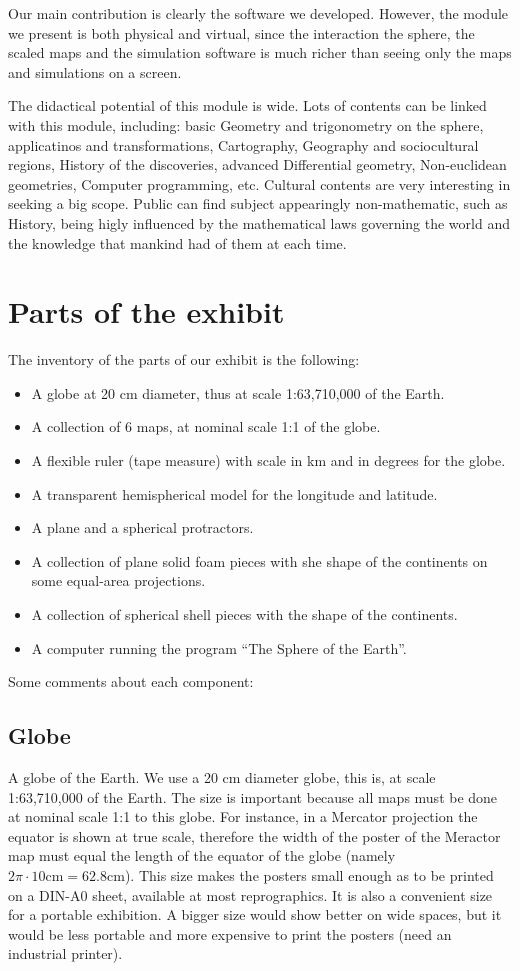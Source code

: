 \documentclass[a4paper,12pt]{article}
\begin{document}
Our main contribution is clearly the software we developed. However, the module we present is both physical and virtual, since the
interaction the sphere, the scaled maps and the simulation software is much richer than seeing only the maps and simulations on a screen.

The didactical potential of this module is wide. Lots of contents can be linked with this module, including: basic Geometry and
trigonometry on the sphere, applicatinos and transformations, Cartography, Geography and sociocultural regions, History of the discoveries,
advanced Differential geometry, Non-euclidean geometries, Computer programming, etc. Cultural contents are very interesting in seeking a
big scope. Public can find subject appearingly non-mathematic, such as History, being higly influenced by the mathematical laws governing
the world and the knowledge that mankind had of them at each time.


\section{Parts of the exhibit}
The inventory of the parts of our exhibit is the following:
\begin{itemize}
 \item A globe at 20 cm diameter, thus at scale 1:63,710,000 of the Earth.
 \item A collection of 6 maps, at nominal scale 1:1 of the globe.
 \item A flexible ruler (tape measure) with scale in km and in degrees for the globe.
 \item A transparent hemispherical model for the longitude and latitude.
 \item A plane and a spherical protractors.
 \item A collection of plane solid foam pieces with she shape of the continents on some equal-area projections.
 \item A collection of spherical shell pieces with the shape of the continents.
 \item A computer running the program ``The Sphere of the Earth''.
\end{itemize}

Some comments about each component:

\subsection{Globe}
A globe of the Earth. We use a 20 cm diameter globe, this is, at scale 1:63,710,000 of the Earth. The size is important because all maps
must be done at nominal scale 1:1 to this globe. For instance, in a Mercator projection the equator is shown at true scale, therefore the
width of the poster of the Meractor map must equal the length of the equator of the globe (namely $2\pi\cdot 10 \mathrm{cm} =
62.8\mathrm{cm}$). This size makes the posters small enough as to be printed on a DIN-A0 sheet, available at most reprographics. It is also
a convenient size for a portable exhibition. A bigger size would show better on wide spaces, but it would be less portable and more
expensive to print the posters (need an industrial printer).
\end{document}
